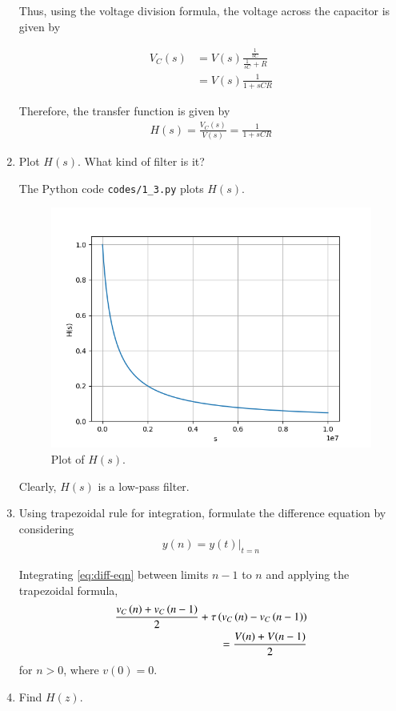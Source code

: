 \documentclass[journal,12pt,twocolumn]{IEEEtran}
\renewcommand\thesection{\arabic{section}}
\begin{document}
\begin{enumerate}[label=\arabic*.,ref=\thesection.\theenumi]
Thus, using the voltage division formula, the voltage across 
the capacitor is given by

\begin{align}
    V_C(s) &= V(s)\frac{\frac{1}{sC}}{\frac{1}{sC} + R} \\
           &= V(s)\frac{1}{1 + sCR}
           \label{eq:vcs}
\end{align}

Therefore, the transfer function is given by
\begin{align}
    H(s) = \frac{V_C(s)}{V(s)} = \frac{1}{1 + sCR}
    \label{eq:hs}
\end{align}
\item Plot $H(s)$. What kind of filter is it?

\solution The Python code \texttt{codes/1\_3.py} plots $H(s)$.
\begin{figure}[!ht]
    \includegraphics[width=\columnwidth]{figs/1_3.png}
    \caption{Plot of $H(s)$.}
    \label{fig:hs}
\end{figure}
Clearly, $H(s)$ is a low-pass filter.

\item Using trapezoidal rule for integration, formulate the difference
equation by considering 
\begin{align}
	y(n) = y(t)\vert_{t=n}
\end{align}

\solution Integrating \eqref{eq:diff-eqn} between limits $n-1$ to $n$ 
and applying the trapezoidal formula,
\begin{align}
    \frac{v_C\left(n\right) + v_C\left(n-1\right)}{2} + \tau\left(v_C\left(n\right)-v_C\left(n-1\right)\right) \nonumber \\
    = \frac{V(n)+V(n-1)}{2}
    \label{eq:difference-eqn}
\end{align}
for $n > 0$, where $v(0) = 0$.
\item Find $H(z)$.


\end{enumerate}
\end{document}
